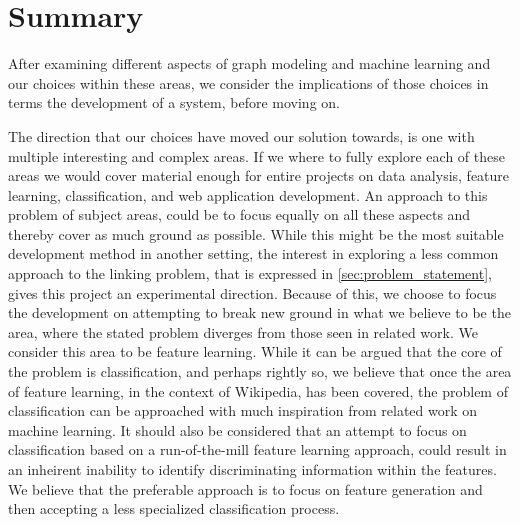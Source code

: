 \section{Summary}

After examining different aspects of graph modeling and machine learning and our choices within these areas, we consider the implications of those choices in terms the development of a system, before moving on.

The direction that our choices have moved our solution towards, is one with multiple interesting and complex areas. If we where to fully explore each of these areas we would cover material enough for entire projects on data analysis, feature learning, classification, and web application development. An approach to this problem of subject areas, could be to focus equally on all these aspects and thereby cover as much ground as possible. While this might be the most suitable development method in another setting, the interest in exploring a less common approach to the linking problem, that is expressed in \cref{sec:problem_statement}, gives this project an experimental direction. Because of this, we choose to focus the development on attempting to break new ground in what we believe to be the area, where the stated problem diverges from those seen in related work. We consider this area to be feature learning. While it can be argued that the core of the problem is classification, and perhaps rightly so, we believe that once the area of feature learning, in the context of Wikipedia, has been covered, the problem of classification can be approached with much inspiration from related work on machine learning. It should also be considered that an attempt to focus on classification based on a run-of-the-mill feature learning approach, could result in an inheirent inability to identify discriminating information within the features. We believe that the preferable approach is to focus on feature generation and then accepting a less specialized classification process.

